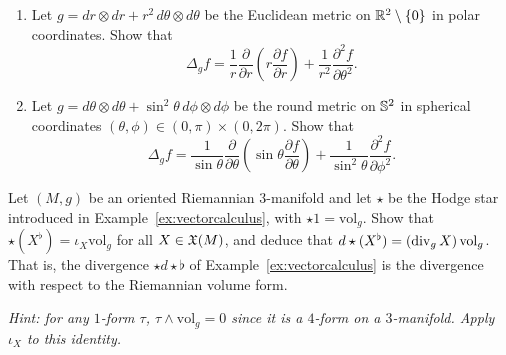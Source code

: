 \begin{exercise}
	\begin{enumerate}
		\item Let $g = dr\otimes dr + r^2\, d\theta\otimes d\theta$ be the Euclidean metric on $\mathbb{R}^2\setminus\{0\}$ in polar coordinates. Show that
		      \begin{equation}
			      \Delta_g f = \frac1r\frac{\partial}{\partial r}\left(r\frac{\partial f}{\partial r}\right) + \frac{1}{r^2}\frac{\partial^2 f}{\partial\theta^2}.
		      \end{equation}
		\item Let $g = d\theta\otimes d\theta + \sin^2\theta\, d\phi\otimes d\phi$ be the round metric on $\mathbb{S}^2$ in spherical coordinates $(\theta,\phi)\in(0,\pi)\times(0,2\pi)$. Show that
		      \begin{equation}
			      \Delta_g f = \frac{1}{\sin\theta}\frac{\partial}{\partial\theta}\left(\sin\theta\frac{\partial f}{\partial\theta}\right) + \frac{1}{\sin^2\theta}\frac{\partial^2 f}{\partial\phi^2}.
		      \end{equation}
	\end{enumerate}
\end{exercise}

\begin{exercise}
	Let $(M,g)$ be an oriented Riemannian $3$-manifold and let $\star$ be the Hodge star introduced in Example~\ref{ex:vectorcalculus}, with $\star1 = \mathrm{vol}_g$.
	Show that $\star(X^\flat) = \iota_X\mathrm{vol}_g$ for all $X\in\mathfrak{X}(M)$, and deduce that $d\star(X^\flat) = (\operatorname{div}_g X)\,\mathrm{vol}_g$.
	That is, the divergence $\star d\star\flat$ of Example~\ref{ex:vectorcalculus} is the divergence with respect to the Riemannian volume form.

	\textit{\small Hint: for any $1$-form $\tau$, $\tau\wedge\mathrm{vol}_g = 0$ since it is a $4$-form on a $3$-manifold. Apply $\iota_X$ to this identity.}
\end{exercise}

